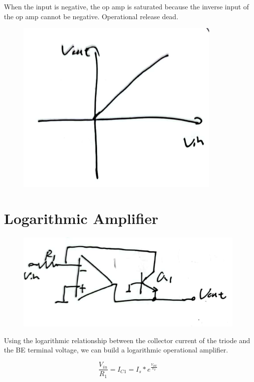 \documentclass[fontset=windows]{article}
\begin{document}
When the input is negative, the op amp is saturated because the inverse input of the op amp cannot be negative. Operational release dead. 

\begin{figure}[htbp]
    \centering
    \includegraphics[scale=0.7]{3.jpg}
    \captionsetup{labelformat=empty}
    \caption{}
    \label{3}
\end{figure}

\section*{Logarithmic Amplifier}

\begin{figure}[htbp]
    \centering
    \includegraphics[scale=0.7]{4.jpg}
    \captionsetup{labelformat=empty}
    \caption{}
    \label{4}
\end{figure}

Using the logarithmic relationship between the collector current of the triode and the BE terminal voltage, we can build a logarithmic operational amplifier. 

$$\frac{V_{in}}{R_1}=I_{C1}=I_s*e^{\frac{V_{BE}}{V_T}}$$
\end{document}
